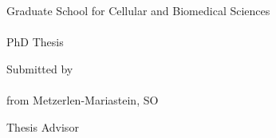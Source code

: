 \begin{titlepage}
	\begin{addmargin}[-1cm]{-3cm}
    \begin{center}
        \large  

        \vfill

		\begingroup
			\color{Maroon}\spacedallcaps{\myTitle} \\ \bigskip
		\endgroup
		\myDegree \\
		\vspace{2cm}
		Graduate School for Cellular and Biomedical Sciences\\
		\myUni\\
		PhD Thesis 

		\vfill


		Submitted by\\
		\medskip
		\spacedallcaps{\myName}\\
		\medskip
		from Metzerlen-Mariastein, SO\\

		\vfill

		Thesis Advisor\\
		\medskip
		\myProf \\
		\myDepartment \\                            
       	\myFaculty \\
       	\myUni \\
		\bigskip
       	\myTime                 
    \end{center}  
  \end{addmargin}       
\end{titlepage}   